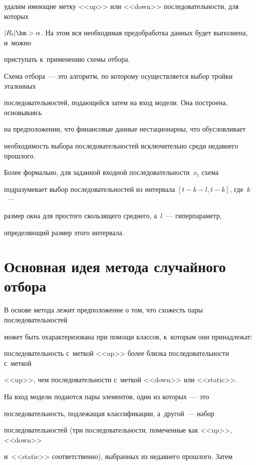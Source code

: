удалим имеющие метку <<up>> или <<down>> последовательности, для которых 

$|R_t| \hm> \alpha$. На этом вся необходимая предобработка данных будет выполнена, и~можно 

приступать к~применению схемы отбора.



Схема отбора~--- это алгоритм, по которому осуществляется выбор тройки эталонных 

последовательностей, подающейся затем на вход модели. Она построена, основываясь 

на предположении, что финансовые данные нестационарны, что обусловливает 

необходимость выбора последовательностей исключительно среди недавнего прошлого. 

Более формально, для заданной входной последовательности~$x_t$ схема 

подразумевает выбор последовательностей из интервала $[t-k-l, t-k]$, где~$k$~--- 

размер окна для прос\-то\-го скользящего среднего, а~$l$~--- гиперпараметр, 

опре\-де\-ля\-ющий размер этого интервала.





\section{Основная идея метода случайного отбора}



В основе метода лежит предположение о том, что схожесть пары последовательностей 

может быть охарактеризована при помощи классов, к~которым они принадлежат: 

последовательность с~меткой <<up>> более близ\-ка по\-сле\-до\-ва\-тель\-ности с~меткой 

<<up>>, чем по\-сле\-до\-ва\-тель\-ности с~меткой <<down>> или <<static>>.



На вход модели подаются пары элементов, один из которых~--- это 

последовательность, подлежащая классификации, а~другой~--- набор 

последовательностей (три последовательности, помеченные как <<up>>, <<down>> 

и~<<static>> соответственно), выбранных из недавнего прошлого. Затем 

